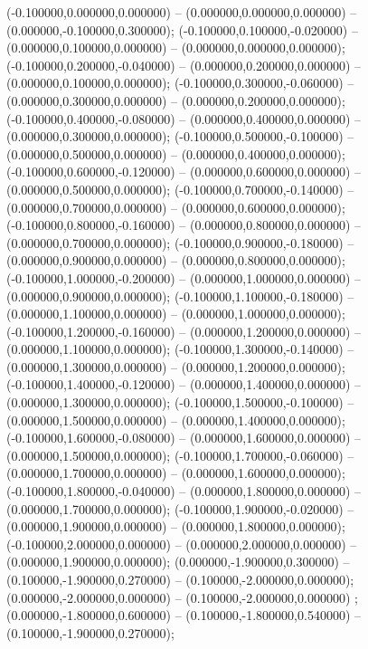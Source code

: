  (-0.100000,0.000000,0.000000) -- (0.000000,0.000000,0.000000) -- (0.000000,-0.100000,0.300000);
 (-0.100000,0.100000,-0.020000) -- (0.000000,0.100000,0.000000) -- (0.000000,0.000000,0.000000);
 (-0.100000,0.200000,-0.040000) -- (0.000000,0.200000,0.000000) -- (0.000000,0.100000,0.000000);
 (-0.100000,0.300000,-0.060000) -- (0.000000,0.300000,0.000000) -- (0.000000,0.200000,0.000000);
 (-0.100000,0.400000,-0.080000) -- (0.000000,0.400000,0.000000) -- (0.000000,0.300000,0.000000);
 (-0.100000,0.500000,-0.100000) -- (0.000000,0.500000,0.000000) -- (0.000000,0.400000,0.000000);
 (-0.100000,0.600000,-0.120000) -- (0.000000,0.600000,0.000000) -- (0.000000,0.500000,0.000000);
 (-0.100000,0.700000,-0.140000) -- (0.000000,0.700000,0.000000) -- (0.000000,0.600000,0.000000);
 (-0.100000,0.800000,-0.160000) -- (0.000000,0.800000,0.000000) -- (0.000000,0.700000,0.000000);
 (-0.100000,0.900000,-0.180000) -- (0.000000,0.900000,0.000000) -- (0.000000,0.800000,0.000000);
 (-0.100000,1.000000,-0.200000) -- (0.000000,1.000000,0.000000) -- (0.000000,0.900000,0.000000);
 (-0.100000,1.100000,-0.180000) -- (0.000000,1.100000,0.000000) -- (0.000000,1.000000,0.000000);
 (-0.100000,1.200000,-0.160000) -- (0.000000,1.200000,0.000000) -- (0.000000,1.100000,0.000000);
 (-0.100000,1.300000,-0.140000) -- (0.000000,1.300000,0.000000) -- (0.000000,1.200000,0.000000);
 (-0.100000,1.400000,-0.120000) -- (0.000000,1.400000,0.000000) -- (0.000000,1.300000,0.000000);
 (-0.100000,1.500000,-0.100000) -- (0.000000,1.500000,0.000000) -- (0.000000,1.400000,0.000000);
 (-0.100000,1.600000,-0.080000) -- (0.000000,1.600000,0.000000) -- (0.000000,1.500000,0.000000);
 (-0.100000,1.700000,-0.060000) -- (0.000000,1.700000,0.000000) -- (0.000000,1.600000,0.000000);
 (-0.100000,1.800000,-0.040000) -- (0.000000,1.800000,0.000000) -- (0.000000,1.700000,0.000000);
 (-0.100000,1.900000,-0.020000) -- (0.000000,1.900000,0.000000) -- (0.000000,1.800000,0.000000);
 (-0.100000,2.000000,0.000000) -- (0.000000,2.000000,0.000000) -- (0.000000,1.900000,0.000000);
 (0.000000,-1.900000,0.300000) -- (0.100000,-1.900000,0.270000) -- (0.100000,-2.000000,0.000000);
 (0.000000,-2.000000,0.000000) -- (0.100000,-2.000000,0.000000) ;
 (0.000000,-1.800000,0.600000) -- (0.100000,-1.800000,0.540000) -- (0.100000,-1.900000,0.270000);
